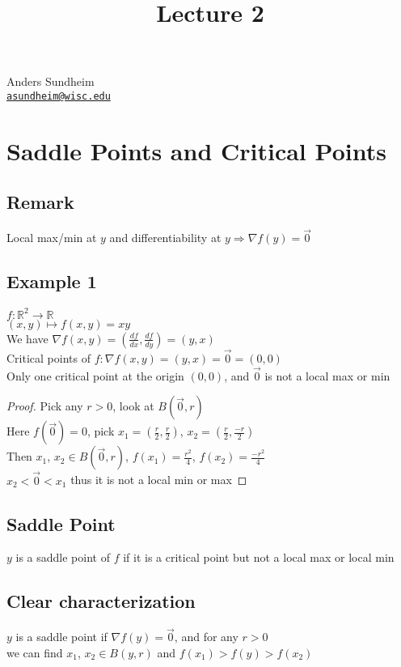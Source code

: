 \documentclass[12pt]{article}
\title{Lecture 2}
\newcommand{\BR}{\mathbb R}
\begin{document}
\maketitle
\vspace*{-0.25in}
\begin{center}
	Anders Sundheim \\
	\href{mailto:asundheim@wisc.edu}{{\tt asundheim@wisc.edu}}
\end{center}
\section{Saddle Points and Critical Points}
  \subsection{Remark}
    Local max/min at $y$ and differentiability at $y\Rightarrow \nabla f(y)=\vec{0}$
  \subsection{Example 1}
    $f:\BR^2\rightarrow\BR$\\
    $(x,y)\mapsto f(x,y)=xy$\\
    We have $\nabla f(x,y) = (\frac{df}{dx},\frac{df}{dy})=(y,x)$\\
    Critical points of $f:\nabla f(x,y) = (y,x) = \vec{0} = (0,0)$\\
    Only one critical point at the origin $(0,0)$, and $\vec{0}$ is not a local max or min\\
    \begin{proof}
      Pick any $r>0$, look at $B(\vec{0}, r)$\\
      Here $f(\vec{0})=0$, pick $x_1=(\frac{r}{2}, \frac{r}{2})$, $x_2=(\frac{r}{2}, \frac{-r}{2})$\\
      Then $x_1$, $x_2\in B(\vec{0}, r)$, $f(x_1)=\frac{r^2}{4}$, $f(x_2)=\frac{-r^2}{4}$\\
      $x_2<\vec{0}<x_1$ thus it is not a local min or max
    \end{proof}
  \subsection{Saddle Point}
    $y$ is a saddle point of $f$ if it is a critical point but not a local max or local min
  \subsection{Clear characterization}
    $y$ is a saddle point if $\nabla f(y)=\vec{0}$, and for any $r>0$\\
    we can find $x_1$, $x_2\in B(y,r)$ and $f(x_1)>f(y)>f(x_2)$
\end{document}
